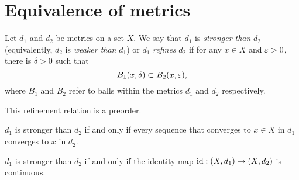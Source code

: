 \documentclass{../../large}
\begin{document}
\section{Equivalence of metrics}
\begin{prb}
Let $d_1$ and $d_2$ be metrics on a set $X$.
We say that $d_1$ is \emph{stronger than} $d_2$ (equivalently, $d_2$ is \emph{weaker than} $d_1$) or $d_1$ \emph{refines} $d_2$ if for any $x\in X$ and $\varepsilon>0$, there is $\delta>0$ such that
\[B_1(x,\delta)\subset B_2(x,\varepsilon),\]
where $B_1$ and $B_2$ refer to balls within the metrics $d_1$ and $d_2$ respectively.
\begin{parts}
\item
This refinement relation is a preorder.
\item
$d_1$ is stronger than $d_2$ if and only if every sequence that converges to $x\in X$ in $d_1$ converges to $x$ in $d_2$.
\item
$d_1$ is stronger than $d_2$ if and only if the identity map $\operatorname{id}:(X,d_1)\to(X,d_2)$ is continuous.
\end{parts}
\end{prb}
\end{document}
